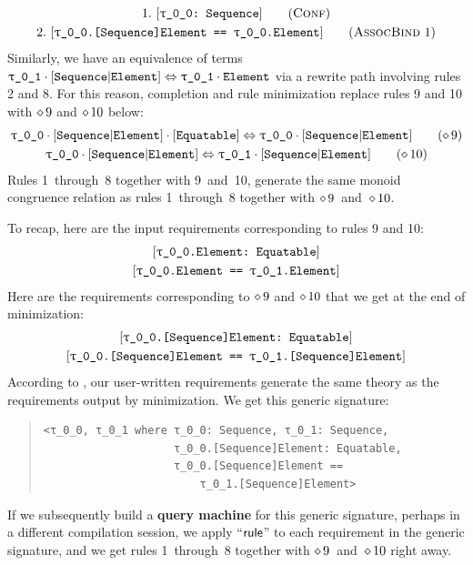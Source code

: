 \documentclass[../generics]{subfiles}
\begin{document}
\begin{example}
\begin{gather*}
\ConfStep{\rT}{Sequence}{1}\\
\AssocBindStep{1}{\rT.[Sequence]Element}{\rT.Element}{2}
\end{gather*}
Similarly, we have an equivalence of terms $\rU\cdot\assocsym{Sequence}{Element} \Eq \rU\cdot\nElement$ via a rewrite path involving rules 2 and 8. For this reason, completion and rule minimization replace rules 9 and 10 with $\diamond\, 9$ and $\diamond\, 10$ below:
\begin{gather*}
\ConfRule{\rT\cdot\assocsym{Sequence}{Element}}{\protosym{Equatable}}\tag{$\CRule{9}$}\\
\SameRule{\rT\cdot\assocsym{Sequence}{Element}}{\rU\cdot\assocsym{Sequence}{Element}}\tag{$\CRule{10}$}
\end{gather*}
Rules 1~through~8 together with 9~and~10, generate the same monoid congruence relation as rules 1~through~8 together with $\diamond\, 9$~and~$\diamond\, 10$.

To recap, here are the input requirements corresponding to rules 9 and 10:
\begin{gather*}
\ConfReq{\rT.Element}{Equatable}\\
\SameReq{\rT.Element}{\rU.Element}
\end{gather*}
Here are the requirements corresponding to $\diamond\, 9$ and $\diamond\, 10$ that we get at the end of minimization:
\begin{gather*}
\ConfReq{\rT.[Sequence]Element}{Equatable}\\
\SameReq{\rT.[Sequence]Element}{\rU.[Sequence]Element}
\end{gather*}
According to , our user-written requirements generate the same theory as the requirements output by minimization. We get this generic signature:
\begin{quote}
\begin{verbatim}
<τ_0_0, τ_0_1 where τ_0_0: Sequence, τ_0_1: Sequence,
                    τ_0_0.[Sequence]Element: Equatable,
                    τ_0_0.[Sequence]Element ==
                        τ_0_1.[Sequence]Element>
\end{verbatim}
\end{quote}
If we subsequently build a \textbf{query machine} for this generic signature, perhaps in a different compilation session, we apply ``$\mathsf{rule}$'' to each requirement in the generic signature, and we get rules 1~through~8 together with $\diamond\, 9$~and~$\diamond\, 10$ right away.
\end{example}
\end{document}
